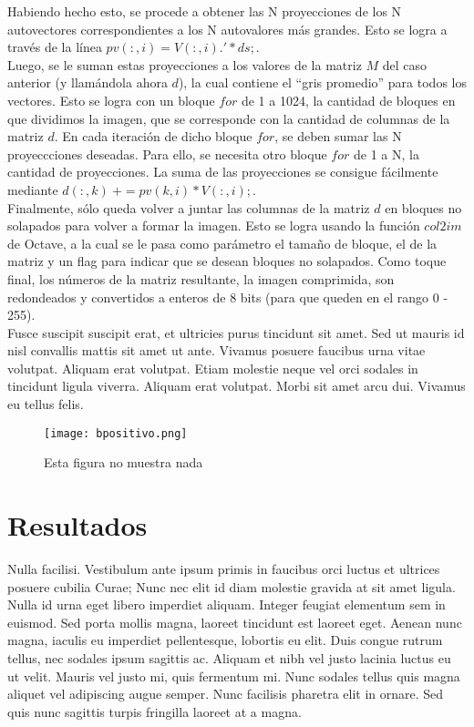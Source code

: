 \documentclass[twocolumn,a4paper,10pt]{article}
\begin{document}
Habiendo hecho esto, se procede a obtener las N proyecciones de los N autovectores correspondientes a los N autovalores más grandes. Esto se logra a través de la 
l\'inea $pv(:,i) = V(:,i).' * ds;$. \\

Luego, se le suman estas proyecciones a los valores de la matriz $M$ del caso anterior (y llam\'andola ahora $d$), la cual contiene el ``gris promedio'' para todos 
los vectores. Esto se logra con un bloque $for$ de 1 a 1024, la cantidad de bloques en que dividimos la imagen, que se corresponde con la cantidad de columnas 
de la matriz $d$. En cada iteración de dicho bloque $for$, se deben sumar las N proyeccciones deseadas. Para ello, se necesita otro bloque $for$ de 1 a N, la cantidad 
de proyecciones. La suma de las proyecciones se consigue f\'acilmente mediante $d(:,k)\: += pv(k,i) * V(:,i);$. \\

Finalmente, s\'olo queda volver a juntar las columnas de la matriz $d$ en bloques no solapados para volver a formar la imagen. Esto se logra usando la funci\'on 
$col2im$ de Octave, a la cual se le pasa como par\'ametro el tamaño de bloque, el de la matriz y un flag para indicar que se desean bloques no solapados. Como toque 
final, los n\'umeros de la matriz resultante, la imagen comprimida, son redondeados y convertidos a enteros de 8 bits (para que queden en el rango 0 - 255).\\

Fusce suscipit suscipit erat, et ultricies purus tincidunt sit amet. Sed ut mauris id nisl convallis mattis sit amet ut ante. Vivamus posuere faucibus urna vitae volutpat. Aliquam erat volutpat. Etiam molestie neque vel orci sodales in tincidunt ligula viverra. Aliquam erat volutpat. Morbi sit amet arcu dui. Vivamus eu tellus felis.

\begin{figure}
    \center \texttt{[image: bpositivo.png]}
    \caption{Esta figura no muestra nada}
\end{figure}

\section{Resultados}
Nulla facilisi. Vestibulum ante ipsum primis in faucibus orci luctus et ultrices posuere cubilia Curae; Nunc nec elit id diam molestie gravida at sit amet ligula. Nulla id urna eget libero imperdiet aliquam. Integer feugiat elementum sem in euismod. Sed porta mollis magna, laoreet tincidunt est laoreet eget. Aenean nunc magna, iaculis eu imperdiet pellentesque, lobortis eu elit. Duis congue rutrum tellus, nec sodales ipsum sagittis ac. Aliquam et nibh vel justo lacinia luctus eu ut velit. Mauris vel justo mi, quis fermentum mi. Nunc sodales tellus quis magna aliquet vel adipiscing augue semper. Nunc facilisis pharetra elit in ornare. Sed quis nunc sagittis turpis fringilla laoreet at a magna.
\end{document}
